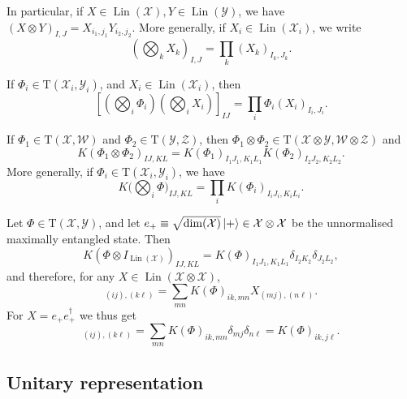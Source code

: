 \documentclass[12pt]{report}
\newcommand{\calY}{{\mathcal{Y}}}
\newcommand{\calW}{{\mathcal{W}}}
\newcommand{\calX}{{\mathcal{X}}}
\newcommand{\calZ}{{\mathcal{Z}}}
\newcommand{\rmT}{{\mathrm{T}}}
\DeclareMathOperator{\Lin}{Lin}
\begin{document}
In particular, if $X\in\Lin(\calX), Y\in\Lin(\calY)$, we have
	$(X\otimes Y)_{I,J} = X_{i_1,j_1} Y_{i_2,j_2}.$
More generally, if $X_i\in\Lin(\calX_i)$, we write
\begin{equation}
	\left(\bigotimes_k X_k\right)_{I,J}
	= \prod_k (X_k)_{I_k,J_k}.
\end{equation}

If $\Phi_i\in\rmT(\calX_i,\calY_i)$, and $X_i\in\Lin(\calX_i)$, then
\begin{equation}
	\left[
	\left(\bigotimes_i \Phi_i\right)\left(\bigotimes_i X_i\right)
	\right]_{IJ}
	= \prod_i \Phi_i(X_i)_{I_i,J_i}.
\end{equation}

If $\Phi_1\in\rmT(\calX,\calW)$ and $\Phi_2\in\rmT(\calY,\calZ)$,
then $\Phi_1\otimes\Phi_2\in\rmT(\calX\otimes\calY,\calW\otimes\calZ)$ and
\begin{equation}
	K(\Phi_1\otimes \Phi_2)_{IJ,KL}
	= K(\Phi_1)_{I_1 J_1, K_1 L_1}
	K(\Phi_2)_{I_2 J_2, K_2 L_2}.
\end{equation}
More generally, if $\Phi_i\in\rmT(\calX_i,\calY_i)$, we have
\begin{equation}
	K\big(\bigotimes_i \Phi\big)_{IJ,KL}
	= \prod_i K(\Phi_i)_{I_i J_i,K_i L_i}.
\end{equation}

\begin{example}
	Let $\Phi\in\rmT(\calX,\calY)$, and let
	$e_+\equiv \sqrt{\dim(\calX)}\ket+\in\calX\otimes\calX$
	be the unnormalised maximally entangled state. Then
	\begin{equation}
		K(\Phi\otimes I_{\Lin(\calX)})_{IJ,KL}
		= K(\Phi)_{I_1 J_1,K_1 L_1}
		\delta_{I_2 K_2} \delta_{J_2 L_2},
	\end{equation}
	and therefore, for any $X\in\Lin(\calX\otimes\calX)$,
	\begin{equation}
		[(\Phi\otimes I_{\Lin(\calX)})(X)]_{(ij),(k\ell)}
		= \sum_{mn} K(\Phi)_{ik,mn} X_{(mj),(n\ell)}.
	\end{equation}
	For $X=e_+ e_+^\dagger$ we thus get
	\begin{equation}
		[(\Phi\otimes I_{\Lin(\calX)})(e_+ e_+^\dagger)]_{(ij),(k\ell)}
		= \sum_{mn}
		K(\Phi)_{ik,mn} \delta_{mj} \delta_{n\ell}
		= K(\Phi)_{ik,j\ell}.
	\end{equation}
\end{example}

\subsection{Unitary representation}
\end{document}

